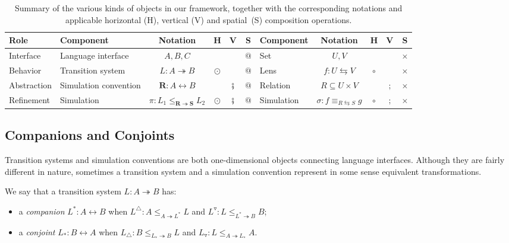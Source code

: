 \documentclass[acmsmall,screen,review,anonymous]{acmart}
\newcommand{\lensarrow}{\leftrightarrows}
\newcommand{\vcomp}{\fatsemi}
\begin{document}
\begin{table}[b] %
  \caption{
    Summary of
    the various kinds of objects in our framework,
    together with the corresponding notations
    and applicable horizontal (H), vertical (V) and spatial~(S)
    composition operations.
} \label{tbl:roadmap}
  \small
  \begin{tabular}{
    l lc c@{\,\:}c@{\:}c @{\quad\:} lc c@{\,\:}c@{\:}c
  }
    \toprule
    Role & Component & Notation & H & V & S
         & Component\hspace{-1em} & Notation & H & V & S
    \\
    \midrule
      Interface
        & Language interface & $A, B, C$
	& & & $\mathbin@$
        & Set & $U, V$
	& & & $\times$
    \\
      Behavior
        & Transition system & $L : A \twoheadrightarrow B$
	& $\odot$ & & $\mathbin@$
        & Lens & $f : U \lensarrow V$
	& $\circ$ & & $\times$
    \\
      Abstraction
        & Simulation convention \hspace{-1em} & $\mathbf{R} : A \leftrightarrow B$
	& & $\vcomp$ & $\mathbin@$
        & Relation & $R \subseteq U \times V$
	& & $\mathbin;$ & $\times$
    \\
      Refinement
        & Simulation &
          $\pi :
           L_1 \le_{\mathbf{R} \twoheadrightarrow \mathbf{S}} L_2$
        & $\odot$ & $\vcomp$ & $\mathbin@$
        & Simulation &
         $\sigma : f \equiv_{R \lensarrow S} g$
	& $\circ$ & $\mathbin;$ & $\times$
    \\
    \bottomrule
  \end{tabular}
\end{table}

\subsection{Companions and Conjoints} \label{sec:overview:companion} %

Transition systems and simulation conventions
are both one-dimensional objects
connecting language interfaces.
Although
they are fairly different in nature,
sometimes
a transition system and a simulation convention
represent in some sense equivalent transformations.

\begin{definition} %
We say that a transition system $L : A \twoheadrightarrow B$ has:
\begin{itemize}
  \item a \emph{companion} $L^* : A \leftrightarrow B$ when
    $L^\triangle : A \le_{A \twoheadrightarrow L^*} L$
    and
    $L^\triangledown : L \le_{L^* \twoheadrightarrow B} B$;
  \item a \emph{conjoint} $L_* : B \leftrightarrow A$ when
    $L_\triangle : B \le_{L_* \twoheadrightarrow B} L$
    and
    $L_\triangledown : L \le_{A \twoheadrightarrow L_*} A$.
\end{itemize}
\end{definition}
\end{document}
